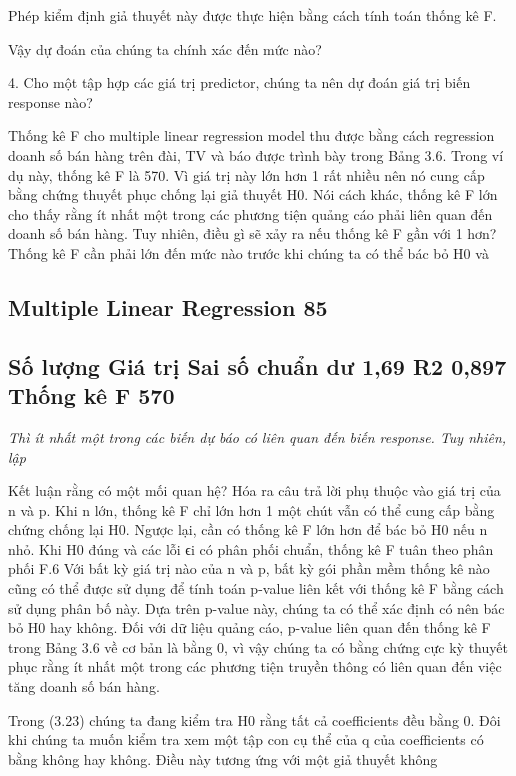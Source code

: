 Phép kiểm định giả thuyết này được thực hiện bằng cách tính toán thống kê F.

Vậy dự đoán của chúng ta chính xác đến mức nào?

4. Cho một tập hợp các giá trị predictor, chúng ta nên dự đoán giá trị biến response nào?

Thống kê F cho multiple linear regression model thu được bằng cách regression doanh số bán hàng trên đài, TV và báo được trình bày trong Bảng 3.6. Trong ví dụ này, thống kê F là 570. Vì giá trị này lớn hơn 1 rất nhiều nên nó cung cấp bằng chứng thuyết phục chống lại giả thuyết H0. Nói cách khác, thống kê F lớn cho thấy rằng ít nhất một trong các phương tiện quảng cáo phải liên quan đến doanh số bán hàng. Tuy nhiên, điều gì sẽ xảy ra nếu thống kê F gần với 1 hơn? Thống kê F cần phải lớn đến mức nào trước khi chúng ta có thể bác bỏ H0 và

\subsection{Multiple Linear Regression 85}

\subsection{Số lượng Giá trị Sai số chuẩn dư 1,69 R2 0,897 Thống kê F 570}

\noindent\textit{Thì ít nhất một trong các biến dự báo có liên quan đến biến response. Tuy nhiên, lập}

Kết luận rằng có một mối quan hệ? Hóa ra câu trả lời phụ thuộc vào giá trị của n và p. Khi n lớn, thống kê F chỉ lớn hơn 1 một chút vẫn có thể cung cấp bằng chứng chống lại H0. Ngược lại, cần có thống kê F lớn hơn để bác bỏ H0 nếu n nhỏ. Khi H0 đúng và các lỗi ϵi có phân phối chuẩn, thống kê F tuân theo phân phối F.6 Với bất kỳ giá trị nào của n và p, bất kỳ gói phần mềm thống kê nào cũng có thể được sử dụng để tính toán p-value liên kết với thống kê F bằng cách sử dụng phân bố này. Dựa trên p-value này, chúng ta có thể xác định có nên bác bỏ H0 hay không. Đối với dữ liệu quảng cáo, p-value liên quan đến thống kê F trong Bảng 3.6 về cơ bản là bằng 0, vì vậy chúng ta có bằng chứng cực kỳ thuyết phục rằng ít nhất một trong các phương tiện truyền thông có liên quan đến việc tăng doanh số bán hàng.

Trong (3.23) chúng ta đang kiểm tra H0 rằng tất cả coefficients đều bằng 0. Đôi khi chúng ta muốn kiểm tra xem một tập con cụ thể của q của coefficients có bằng không hay không. Điều này tương ứng với một giả thuyết không

